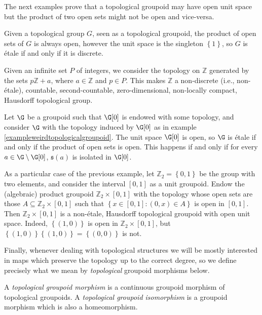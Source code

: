 The next examples prove that a topological groupoid may have open unit space but the product of two open sets might not be open and vice-versa.

\begin{example}
Given a topological group $G$, seen as a topological groupoid, the product of open sets of $G$ is always open, however the unit space is the singleton $\left\{1\right\}$, so $G$ is étale if and only if it is discrete.
\end{example}

\begin{example}\label{exampledifferenttopologyonZ}
Given an infinite set $P$ of integers, we consider the topology on $\mathbb{Z}$ generated by the sets $p\mathbb{Z}+a$, where $a\in\mathbb{Z}$ and $p\in P$. This makes $\mathbb{Z}$ a non-discrete (i.e., non-étale), countable, second-countable, zero-dimensional, non-locally compact, Hausdorff topological group.
\end{example}

\begin{example}
Let $\G$ be a groupoid such that $\G[0]$ is endowed with some topology, and consider $\G$ with the topology induced by $\G[0]$ as in example \ref{exampleweirdtopologicalgroupoid}. The unit space $\G[0]$ is open, so $\G$ is étale if and only if the product of open sets is open. This happens if and only if for every $a\in\G\setminus\G[0]$, $\mathfrak{s}(a)$ is isolated in $\G[0]$.
\end{example}

\begin{example}
As a particular case of the previous example, let $\mathbb{Z}_2=\left\{0,1\right\}$ be the group with two elements, and consider the interval $[0,1]$ as a unit groupoid. Endow the (algebraic) product groupoid $\mathbb{Z}_2\times [0,1]$ with the topology whose open sets are those $A\subseteq\mathbb{Z}_2\times[0,1]$ such that $\left\{x\in[0,1]:(0,x)\in A\right\}$ is open in $[0,1]$. Then $\mathbb{Z}_2\times[0,1]$ is a non-étale, Hausdorff topological groupoid with open unit space. Indeed, $\left\{(1,0)\right\}$ is open in $\mathbb{Z}_2\times[0,1]$, but $\left\{(1,0)\right\}\left\{(1,0)\right\}=\left\{(0,0)\right\}$ is not.
\end{example}

Finally, whenever dealing with topological structures we will be mostly interested in maps which preserve the topology up to the correct degree, so we define precisely what we mean by \emph{topological} groupoid morphisms below.

\begin{definition}
A \emph{topological groupoid morphism} is a continuous groupoid morphism of topological groupoids. A \emph{topological groupoid isomorphism} is a groupoid morphism which is also a homeomorphism.
\end{definition}
